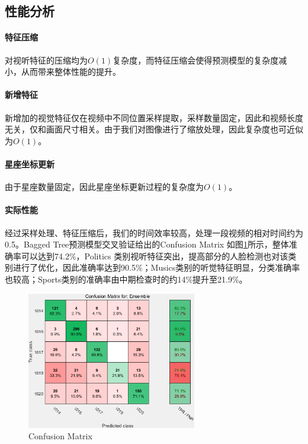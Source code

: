 \documentclass{article}
\begin{document}
\begin{multicols}{2}
        \subsection{性能分析}
            \paragraph{特征压缩}
            对视听特征的压缩均为$O(1)$复杂度，而特征压缩会使得预测模型的复杂度减小，从而带来整体性能的提升。

            \paragraph{新增特征}
            新增加的视觉特征仅在视频中不同位置采样提取，采样数量固定，因此和视频长度无关，仅和画面尺寸相关。由于我们对图像进行了缩放处理，因此复杂度也可近似为$O(1)$。

            \paragraph{星座坐标更新}
            由于星座数量固定，因此星座坐标更新过程的复杂度为$O(1)$。

            \paragraph{实际性能}
            经过采样处理、特征压缩后，我们的时间效率较高，处理一段视频的相对时间约为0.5。Bagged Tree预测模型交叉验证给出的Confusion Matrix 如图\ref{fig:confusionmatrix}所示，整体准确率可以达到74.2\%，Politics 类别视听特征突出，提高部分的人脸检测也对该类别进行了优化，因此准确率达到90.5\%；Musics类别的听觉特征明显，分类准确率也较高；Sports类别的准确率由中期检查时的约14\%提升至21.9\%。
            
            \begin{figure}[H]
              \centering
              \includegraphics[width=7.4cm]{confusionmatrix.png}
              \caption{Confusion Matrix}\label{fig:confusionmatrix}
            \end{figure}


\end{multicols}
\end{document}
